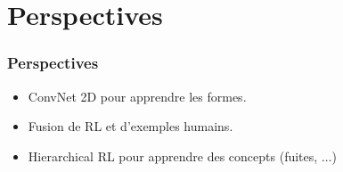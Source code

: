 \documentclass[smaller]{beamer}
\begin{document}
\section{Perspectives}

\begin{frame}
  \frametitle{Perspectives}

  \begin{exampleblock}{}
    \begin{itemize}
    \item ConvNet 2D pour apprendre les formes.
      \medskip
    \item Fusion de RL et d'exemples humains.
      \medskip
    \item Hierarchical  RL  pour   apprendre  des  concepts  (fuites, $\ldots$)
    \end{itemize}
  \end{exampleblock}
  
\end{frame}
\end{document}
